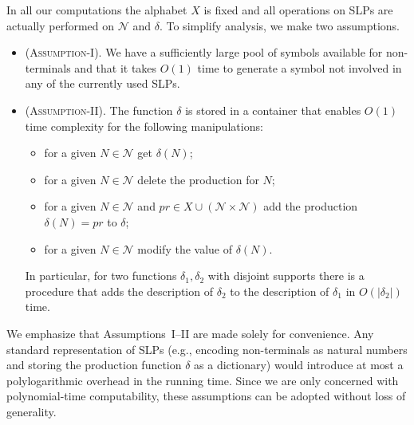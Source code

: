 \documentclass[12pt,oneside]{amsart}
\theoremstyle{definition}
\theoremstyle{case}
\def\CN{{\mathcal N}}
\def\MZ{{\mathbb{Z}}}
\begin{document}
In all our computations the alphabet $X$ is fixed and all operations
on SLPs are actually performed on $\CN$ and $\delta$.
To simplify analysis, we make two assumptions.
\begin{itemize}
\item 
\textsc{(Assumption-I).}
We have a sufficiently large pool 
of symbols available for non-terminals
and that it takes $O(1)$ time to generate a symbol not involved in
any of the currently used SLPs.
\item 
\textsc{(Assumption-II).}
The function $\delta$ is stored in a container that enables
$O(1)$ time complexity for the following manipulations:
\begin{itemize}
\item 
for a given $N\in\CN$ get $\delta(N)$;
\item 
for a given $N\in\CN$ delete the production for $N$;
\item 
for a given $N\in\CN$ and $pr\in X \cup (\CN\times \CN)$
add the production $\delta(N)= pr$ to $\delta$;
\item 
for a given $N\in\CN$ modify the value of $\delta(N)$.
\end{itemize}
In particular, for two functions $\delta_1,\delta_2$ with disjoint supports
there is a procedure that 
adds the description of $\delta_2$ to the description of $\delta_1$
in $O(|\delta_2|)$ time.
\end{itemize}
We emphasize that Assumptions~I--II are made solely for convenience.
Any standard representation of SLPs (e.g., encoding non-terminals as natural
numbers and storing the production function $\delta$ as a dictionary)
would introduce at most a polylogarithmic overhead in the running time.
Since we are only concerned with polynomial-time computability,
these assumptions can be adopted without loss of generality.
\end{document}
